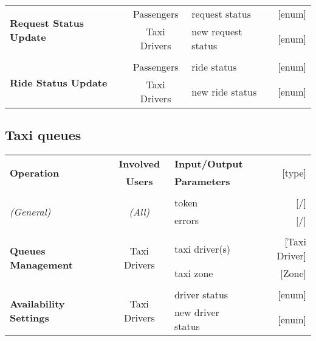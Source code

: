 \begin{center}
\begin{tabular}{ l | c | l   r }
			\multirow{2}{*}{\textbf{Request Status Update}}
			& \multirow{1}{*}{Passengers}
			& request status & [enum]\\
			& \multirow{1}{*}{Taxi Drivers}
			& new request status & [enum]\\ [1.5ex]
			\hline\\
			
			\multirow{2}{*}{\textbf{Ride Status Update}}
				& \multirow{1}{*}{Passengers}
					& ride status & [enum]\\
				& \multirow{1}{*}{Taxi Drivers}
					& new ride status & [enum]\\ [1.5ex]
			\hline
		\end{tabular}
	\end{center}

\subsection{Taxi queues}
	\begin{center}
		\begin{tabular}{ l | c | l   r }
			\multirow{2}{*}{\textbf{Operation}} & \textbf{Involved} & \textbf{Input/Output} & \multirow{2}{*}{[type]}\\
			& \textbf{Users} & \textbf{Parameters} & \\ [1.5ex]
			\hline\hline\\
			
			\multirow{2}{*}{\textit{(General)}}
				& \multirow{2}{*}{\textit{(All)}}
				&	token & [/]\\
				&&	errors & [/]\\ [1.5ex]
			\hline\\
			
			\multirow{2}{*}{\textbf{Queues Management}}
				& \multirow{2}{*}{Taxi Drivers}
					&	taxi driver(s) & [Taxi Driver]\\
					&&	taxi zone & [Zone]\\ [1.5ex]
			\hline\\
			
			\multirow{2}{*}{\textbf{Availability Settings}}
				& \multirow{2}{*}{Taxi Drivers}
					&	driver status & [enum]\\
					&&	new driver status & [enum]\\ [1.5ex]
			\hline
		\end{tabular}
	\end{center}
	

